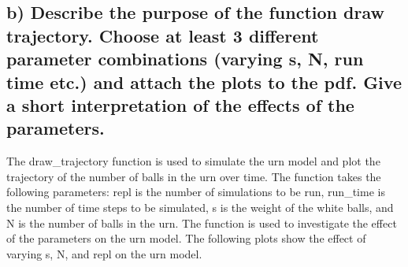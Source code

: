 \documentclass[
]{article}
\begin{document}
\hypertarget{b-describe-the-purpose-of-the-function-draw-trajectory.-choose-at-least-3-different-parameter-combinations-varying-s-n-run-time-etc.-and-attach-the-plots-to-the-pdf.-give-a-short-interpretation-of-the-effects-of-the-parameters.}{%
\subsection{b) Describe the purpose of the function draw trajectory.
Choose at least 3 different parameter combinations (varying s, N, run
time etc.) and attach the plots to the pdf. Give a short interpretation
of the effects of the
parameters.}\label{b-describe-the-purpose-of-the-function-draw-trajectory.-choose-at-least-3-different-parameter-combinations-varying-s-n-run-time-etc.-and-attach-the-plots-to-the-pdf.-give-a-short-interpretation-of-the-effects-of-the-parameters.}}

The draw\_trajectory function is used to simulate the urn model and plot
the trajectory of the number of balls in the urn over time. The function
takes the following parameters: repl is the number of simulations to be
run, run\_time is the number of time steps to be simulated, s is the
weight of the white balls, and N is the number of balls in the urn. The
function is used to investigate the effect of the parameters on the urn
model. The following plots show the effect of varying s, N, and repl on
the urn model.
\end{document}
